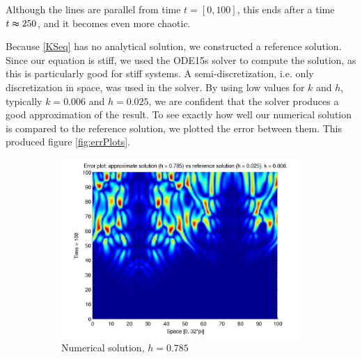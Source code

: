Although the lines are parallel from time $t = [0,100]$, this ends after a time $t \thickapprox 250$, and it becomes even more chaotic.

Because \eqref{KSeq} has no analytical solution, we constructed a reference solution. Since our equation is stiff, we used the ODE15s solver to compute the solution, as this is particularly good for stiff systems. A semi-discretization, i.e. only discretization in space, was used in the solver. By using low values for $k$ and $h$, typically $k = 0.006$ and $h = 0.025$, we are confident that the solver produces a good approximation of the result. To see exactly how well our numerical solution is compared to the reference solution, we plotted the error between them. This produced figure \ref{fig:errPlots}.

\begin{figure}[H]
        \centering
        \begin{subfigure}[b]{0.52\textwidth}
                \includegraphics[width=\textwidth]{../PDFs/IMEX/error_num_ref_t100_3rd.pdf}
                \caption{Numerical solution, $h = 0.785$}
                \label{fig:highError}
        \end{subfigure}%
        ~ %
        \begin{subfigure}[b]{0.52\textwidth}

\end{subfigure}
\end{figure}
